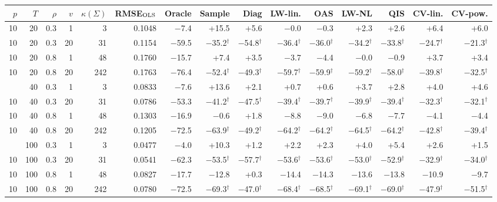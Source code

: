 \begin{tabular}{@{}rrrrr rrrrrrrrrr@{}}
\toprule
$p$ & $T$ & $\rho$ & $v$ & $\kappa(\Sigma)$ & RMSE$_{\rm OLS}$ & Oracle & Sample & Diag & LW-lin. & OAS & LW-NL & QIS & CV-lin. & CV-pow. \\
\midrule
10 & 20 & 0.3 & 1 & 3 & 0.1048 & $-$7.4 & +15.5 & +5.6 & $-$0.0 & $-$0.3 & +2.3 & +2.6 & +6.4 & +6.0 \\
10 & 20 & 0.3 & 20 & 31 & 0.1154 & $-$59.5 & $-$35.2$^{\dagger}$ & $-$54.8$^{\dagger}$ & $-$36.4$^{\dagger}$ & $-$36.0$^{\dagger}$ & $-$34.2$^{\dagger}$ & $-$33.8$^{\dagger}$ & $-$24.7$^{\dagger}$ & $-$21.3$^{\dagger}$ \\
10 & 20 & 0.8 & 1 & 48 & 0.1760 & $-$15.7 & +7.4 & +3.5 & $-$3.7 & $-$4.4 & $-$0.0 & $-$0.9 & +3.7 & +3.4 \\
10 & 20 & 0.8 & 20 & 242 & 0.1763 & $-$76.4 & $-$52.4$^{\dagger}$ & $-$49.3$^{\dagger}$ & $-$59.7$^{\dagger}$ & $-$59.9$^{\dagger}$ & $-$59.2$^{\dagger}$ & $-$58.0$^{\dagger}$ & $-$39.8$^{\dagger}$ & $-$32.5$^{\dagger}$ \\
\addlinespace[1pt]
10 & 40 & 0.3 & 1 & 3 & 0.0833 & $-$7.6 & +13.6 & +2.1 & +0.7 & +0.6 & +3.7 & +2.8 & +4.0 & +4.6 \\
10 & 40 & 0.3 & 20 & 31 & 0.0786 & $-$53.3 & $-$41.2$^{\dagger}$ & $-$47.5$^{\dagger}$ & $-$39.4$^{\dagger}$ & $-$39.7$^{\dagger}$ & $-$39.9$^{\dagger}$ & $-$39.4$^{\dagger}$ & $-$32.3$^{\dagger}$ & $-$32.1$^{\dagger}$ \\
10 & 40 & 0.8 & 1 & 48 & 0.1303 & $-$16.9 & $-$0.6 & +1.8 & $-$8.8 & $-$9.0 & $-$6.8 & $-$7.7 & $-$4.1 & $-$4.4 \\
10 & 40 & 0.8 & 20 & 242 & 0.1205 & $-$72.5 & $-$63.9$^{\dagger}$ & $-$49.2$^{\dagger}$ & $-$64.2$^{\dagger}$ & $-$64.2$^{\dagger}$ & $-$64.5$^{\dagger}$ & $-$64.2$^{\dagger}$ & $-$42.8$^{\dagger}$ & $-$39.4$^{\dagger}$ \\
\addlinespace[1pt]
10 & 100 & 0.3 & 1 & 3 & 0.0477 & $-$4.0 & +10.3 & +1.2 & +2.2 & +2.3 & +4.0 & +5.4 & +2.6 & +1.5 \\
10 & 100 & 0.3 & 20 & 31 & 0.0541 & $-$62.3 & $-$53.5$^{\dagger}$ & $-$57.7$^{\dagger}$ & $-$53.6$^{\dagger}$ & $-$53.6$^{\dagger}$ & $-$53.0$^{\dagger}$ & $-$52.9$^{\dagger}$ & $-$32.9$^{\dagger}$ & $-$34.0$^{\dagger}$ \\
10 & 100 & 0.8 & 1 & 48 & 0.0827 & $-$17.7 & $-$12.8 & +0.3 & $-$14.4 & $-$14.3 & $-$13.6 & $-$13.8 & $-$10.9 & $-$9.7 \\
10 & 100 & 0.8 & 20 & 242 & 0.0780 & $-$72.5 & $-$69.3$^{\dagger}$ & $-$47.0$^{\dagger}$ & $-$68.4$^{\dagger}$ & $-$68.5$^{\dagger}$ & $-$69.1$^{\dagger}$ & $-$69.0$^{\dagger}$ & $-$47.9$^{\dagger}$ & $-$51.5$^{\dagger}$ \\

\end{tabular}
